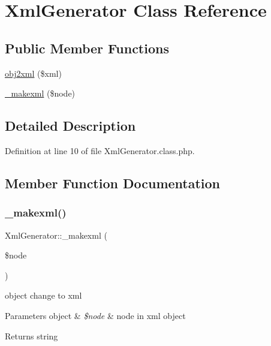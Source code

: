 \hypertarget{classXmlGenerator}{}\section{Xml\+Generator Class Reference}
\label{classXmlGenerator}
\subsection*{Public Member Functions}
\begin{DoxyCompactItemize}
\item 
\hyperlink{classXmlGenerator_ae887d13949d0ec6537feb11f6d9aa00f}{obj2xml} (\$xml)
\item 
\hyperlink{classXmlGenerator_a6cc99afb973e29301b794c22159056fa}{\+\_\+makexml} (\$node)
\end{DoxyCompactItemize}


\subsection{Detailed Description}


Definition at line 10 of file Xml\+Generator.\+class.\+php.



\subsection{Member Function Documentation}
\hypertarget{classXmlGenerator_a6cc99afb973e29301b794c22159056fa}{}\label{classXmlGenerator_a6cc99afb973e29301b794c22159056fa} 
\subsubsection{\texorpdfstring{\+\_\+makexml()}{\_makexml()}}
{\footnotesize\ttfamily Xml\+Generator\+::\+\_\+makexml (\begin{DoxyParamCaption}\item[{}]{\$node }\end{DoxyParamCaption})}

object change to xml 
\begin{DoxyParams}[1]{Parameters}
object & {\em \$node} & node in xml object \\
\hline
\end{DoxyParams}
\begin{DoxyReturn}{Returns}
string 
\end{DoxyReturn}


